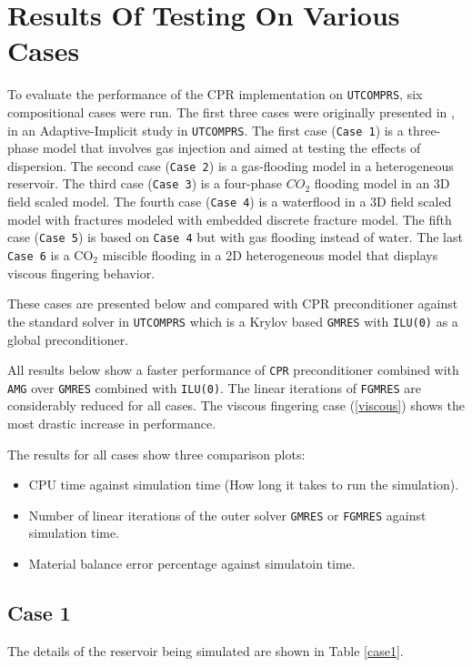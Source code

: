 \chapter{Results Of Testing On Various Cases}
To evaluate the performance of the CPR implementation on \texttt{UTCOMPRS}, six compositional cases were run. 
The first three cases were originally presented in \cite{fernandes}, in an Adaptive-Implicit study in \texttt{UTCOMPRS}. 
The first case (\texttt{Case 1}) is a three-phase model that involves gas injection and aimed 
at testing the effects of dispersion. The second case (\texttt{Case 2}) is a gas-flooding model in 
a heterogeneous reservoir. The third case (\texttt{Case 3}) is a four-phase $CO_{2}$ flooding model 
in an 3D field scaled model. The fourth case (\texttt{Case 4}) is a waterflood in a 3D field scaled model with fractures
modeled with embedded discrete fracture model. The fifth case (\texttt{Case 5}) is based on \texttt{Case 4} but with gas flooding
instead of water. The last \texttt{Case 6} is a CO$_{2}$ miscible flooding in a 2D heterogeneous model that displays viscous fingering behavior. 

These cases are presented below and compared with CPR preconditioner against
the standard solver in \texttt{UTCOMPRS} which is a Krylov based \texttt{GMRES} with \texttt{ILU(0)} as a global
preconditioner. 

All results below show a faster performance of \texttt{CPR} preconditioner combined with \texttt{AMG} 
over \texttt{GMRES} combined with \texttt{ILU(0)}. The linear iterations of \texttt{FGMRES} are considerably 
reduced for all cases. The viscous fingering case (\ref{viscous}) shows the most drastic increase in performance.
\newline

The results for all cases show three comparison plots:
\begin{itemize}
	\item CPU time against simulation time (How long it takes to run the simulation).
	\item Number of linear iterations of the outer solver \texttt{GMRES} or \texttt{FGMRES} against simulation time.
	\item Material balance error percentage against simulatoin time.
\end{itemize}

\clearpage

\section{Case 1}
The details of the reservoir being simulated are shown in Table \ref{case1}. 

